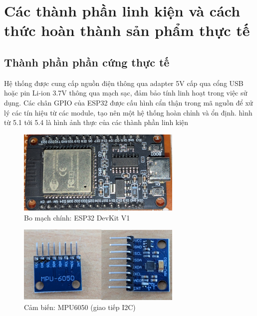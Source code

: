\documentclass[a4paper,12pt]{report}
\begin{document}
	\section{Các thành phần linh kiện và cách thức hoàn thành sản phẩm thực tế}
	
	\subsection{Thành phần phần cứng thực tế}
	
	Hệ thống được cung cấp nguồn điện thông qua adapter 5V cấp qua cổng USB hoặc pin Li-ion 3.7V thông qua mạch sạc, đảm bảo tính linh hoạt trong việc sử dụng. Các chân GPIO của ESP32 được cấu hình cẩn thận trong mã nguồn để xử lý các tín hiệu từ các module, tạo nên một hệ thống hoàn chỉnh và ổn định. hình từ 5.1 tới 5.4 là hình ảnh thực của các thành phần linh kiện
	
	\begin{figure}[h]
		\centering
		\includegraphics[width=0.7\textwidth]{real_mainboar-esp32.png}
		\caption{Bo mạch chính: ESP32 DevKit V1}
		\label{fig:esp32_devkit}
	\end{figure}
	
	\vspace{2cm}
	
	\begin{figure}[h]
		\centering
		\includegraphics[width=0.7\textwidth]{real_6050.png}
		\caption{Cảm biến: MPU6050 (giao tiếp I2C)}
		\label{fig:mpu6050_sensor}
	\end{figure}
	
	\vspace{2cm} 
	
\end{document}
